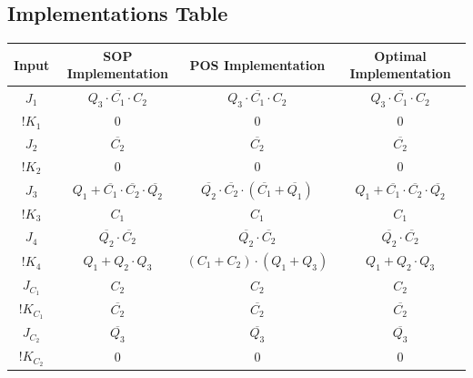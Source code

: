 \documentclass{article}
\begin{document}
\subsection{Implementations Table}
\begin{tabular}{|c|c|c|c|}
    \hline
    Input & SOP Implementation & POS Implementation & Optimal Implementation \\
    \hline
    $J_1$ & $Q_3\cdot\overline{C_1}\cdot{C_2}$ & $Q_3\cdot\overline{C_1}\cdot{C_2}$ & $Q_3\cdot\overline{C_1}\cdot{C_2}$ \\
    \hline
    $!K_1$ & 0 & 0 & 0 \\
    \hline
    $J_2$ & $\overline{C_2}$ & $\overline{C_2}$ & $\overline{C_2}$ \\
    \hline
    $!K_2$ & 0 & 0 & 0 \\
    \hline
    $J_3$ & $Q_1+\overline{C_1}\cdot\overline{C_2}\cdot\overline{Q_2}$ & $\overline{Q_2}\cdot\overline{C_2}\cdot(\overline{C_1}+\overline{Q_1})$ & $Q_1+\overline{C_1}\cdot\overline{C_2}\cdot\overline{Q_2}$ \\
    \hline
    $!K_3$ & $C_1$ & $C_1$ & $C_1$ \\
    \hline
    $J_4$ & $\overline{Q_2}\cdot\overline{C_2}$ & $\overline{Q_2}\cdot\overline{C_2}$ & $\overline{Q_2}\cdot\overline{C_2}$ \\
    \hline
    $!K_4$ & $Q_1+Q_2\cdot Q_3$ & $(C_1+C_2)\cdot(Q_1+Q_3)$ & $Q_1+Q_2\cdot Q_3$ \\
    \hline
    $J_{C_1}$ & $C_2$ & $C_2$ & $C_2$ \\
    \hline
    $!K_{C_1}$ & $\overline{C_2}$ & $\overline{C_2}$ & $\overline{C_2}$ \\
    \hline
    $J_{C_2}$ & $\overline{Q_3}$ & $\overline{Q_3}$ & $\overline{Q_3}$ \\
    \hline
    $!K_{C_2}$ & 0 & 0 & 0 \\
    \hline
\end{tabular}
\newpage
\end{document}
